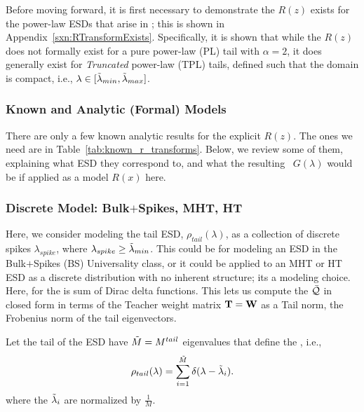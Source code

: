 Before moving forward, it is first necessary to demonstrate the \RTransform $R(z)$ exists for the power-law ESDs that arise in \SETOL; this is shown in Appendix~\ref{sxn:RTransformExists}.  Specifically, it is shown that while the $R(z)$ does not formally exist for a pure power-law (PL) tail with $\alpha=2$, it does generally exist for \emph{Truncated} power-law (TPL) tails, defined such that the domain is compact, i.e., $\lambda\in[{\tilde{\lambda}_{min}}, \tilde{\lambda}_{max}]$. 

\subsubsection{Known \RTransforms and Analytic (Formal) Models}
\label{sxn:r_transforms:known_r_transforms}

There are only a few known analytic results for the explicit \RTransform $R(z)$.
The ones we need are in Table~\ref{tab:known_r_transforms}.
Below, we review some of them, explaining what ESD they correspond to,
and what the resulting \GEN~$G(\lambda)$ would be if applied
as a model $R(x)$ here.



\subsubsection{Discrete Model: Bulk\texorpdfstring{$+$}{+}Spikes, MHT, HT}

Here, we consider modeling the tail ESD, $\rho_{tail}(\lambda)$, as a collection
of discrete spikes $\lambda_{spike}$, 
where $\lambda_{spike}\ge {\tilde{\lambda}_{min}}$.
This could be for modeling an ESD in the Bulk$+$Spikes (BS) \HTSR Universality class,
or it could be applied to an MHT or HT ESD as a discrete distribution with
no inherent structure; its a modeling choice.
Here, \RTransform for the \ECS is sum of Dirac delta functions.
This lets us compute the \LayerQuality $\bar{\mathcal{Q}}$ in closed form in terms of the Teacher weight matrix
${\mathbf{T}}={\mathbf{W}}$ as a Tail norm, the Frobenius norm of the tail eigenvectors.

Let the tail of the ESD have $\tilde{M} = M^{tail}$ eigenvalues that define the \ECS, i.e.,  
\begin{equation}
\label{eqn:spikes_model_0}
\rho_{tail}(\lambda)=\sum_{i=1}^{\tilde{M}}\delta(\lambda-\tilde{\lambda}_{i}) .
\end{equation}
where the $\tilde{\lambda}_{i}$ are normalized by $\tfrac{1}{M}$.

